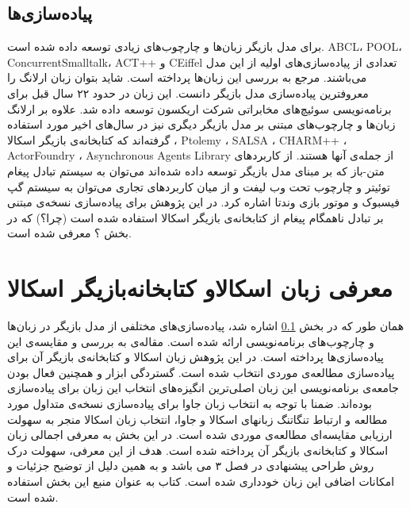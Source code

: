 \subsection{پیاده‌سازی‌ها}
\label{subsection:actorImpls}
برای مدل بازیگر زبان‌ها و چارچوب‌های زیادی توسعه داده شده است. ABCL، POOL، ConcurrentSmalltalk، ACT++ و CEiffel تعدادی از پیاده‌سازی‌های اولیه از این مدل می‌باشند. مرجع \cite{Briot98concurrencyand} به بررسی این زبان‌ها پرداخته است. شاید بتوان زبان  \gls{ارلانگ}\cite{erlang} را معروفترین پیاده‌سازی مدل بازیگر دانست. این زبان در حدود ۲۲ سال قبل برای برنامه‌نویسی سوئیچ‌های مخابراتی شرکت اریکسون توسعه داده شد. علاوه بر ارلانگ زبان‌ها و چارچوب‌های مبتنی بر مدل بازیگر دیگری نیز در سال‌های اخیر مورد استفاده گرفته‌اند که کتابخانه‌ی بازیگر اسکالا
 \cite{ScalaActors}،  Ptolemy \cite{Ptolemy}، SALSA \cite{salsa}، CHARM++ \cite{CHARMplus}، ActorFoundry \cite{ActorFoundry}، Asynchronous Agents Library \cite{AsyncAgentsLib}  از جمله‌ی آنها هستند.
  از کاربردهای متن-باز که بر مبنای مدل بازیگر توسعه داده شده‌اند می‌توان به سیستم تبادل پیغام توئیتر و چارچوب تحت وب لیفت و از میان کاربرد‌های تجاری می‌توان به سیستم گپ فیسبوک و موتور بازی وندتا اشاره کرد.
در این پژوهش برای پیاده‌سازی نسخه‌ی مبتنی بر تبادل ناهمگام پیغام از کتابخانه‌ی بازیگر اسکالا استفاده شده است (چرا؟) که در بخش ؟ معرفی شده است.


\section{معرفی زبان اسکالاو  کتابخانه‌بازیگر اسکالا}
\label{section:Scala}
همان طور که در بخش \ref{subsection:actorImpls} اشاره شد، پیاده‌سازی‌های مختلفی از مدل بازیگر در زبان‌ها و چارچوب‌های برنامه‌نویسی ارائه شده است. مقاله‌ی \cite{ActorsJVM2009} به بررسی و مقایسه‌ی این پیاده‌سازی‌ها پرداخته است. در این پژوهش زبان اسکالا و کتابخانه‌ی بازیگر آن برای پیاده‌سازی مطالعه‌ی موردی انتخاب شده است. گستردگی ابزار و همچنین فعال بودن جامعه‌ی برنامه‌نویسی این زبان اصلی‌ترین انگیزه‌های انتخاب این زبان برای پیاده‌سازی بوده‌اند. ضمنا با توجه به انتخاب زبان جاوا برای پیاده‌سازی نسخه‌ی متداول مورد مطالعه و ارتباط تنگاتنگ زبانهای اسکالا و جاوا، انتخاب زبان اسکالا منجر به سهولت ارزیابی مقایسه‌ای مطالعه‌ی موردی شده است. در این بخش به معرفی اجمالی زبان اسکالا و کتابخانه‌ی بازیگر آن پرداخته شده است. هدف از این معرفی، سهولت درک روش طراحی پیشنهادی در فصل ۳ می باشد و به همین دلیل از توضیح جزئیات و امکانات اضافی این زبان خودداری شده است. کتاب \cite{programmingInScala} به عنوان منبع این بخش استفاده شده است.
